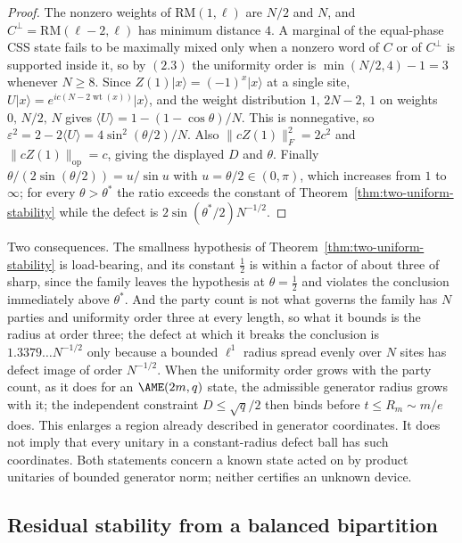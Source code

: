 \begin{proof}
The nonzero weights of \(\mathrm{RM}(1,\ell)\) are \(N/2\) and \(N\), and
\(C^\perp=\mathrm{RM}(\ell-2,\ell)\) has minimum distance \(4\).  A
marginal of the equal-phase CSS state fails to be maximally mixed only when
a nonzero word of \(C\) or of \(C^\perp\) is supported inside it, so by
\((2.3)\) the uniformity order is
\(\min(N/2,4)-1=3\) whenever \(N\geq8\).  Since
\(Z(1)\lvert x\rangle=(-1)^x\lvert x\rangle\) at a single site,
\(U\lvert x\rangle=e^{ic(N-2\operatorname{wt}(x))}\lvert x\rangle\), and
the weight distribution \(1,\,2N-2,\,1\) on weights \(0,\,N/2,\,N\) gives
\(\langle U\rangle=1-(1-\cos\theta)/N\).  This is nonnegative, so
\(\varepsilon^2=2-2\langle U\rangle=4\sin^2(\theta/2)/N\).  Also
\(\lVert cZ(1)\rVert_F^2=2c^2\) and
\(\lVert cZ(1)\rVert_{\mathrm{op}}=c\), giving the displayed \(D\) and
\(\theta\).  Finally \(\theta/(2\sin(\theta/2))=u/\sin u\) with
\(u=\theta/2\in(0,\pi)\), which increases from \(1\) to \(\infty\); for
every \(\theta>\theta^*\) the ratio exceeds the constant of
Theorem~\ref{thm:two-uniform-stability} while the defect is
\(2\sin(\theta^*/2)N^{-1/2}\).
\end{proof}

\AMEFigureFive

Two consequences.  The smallness hypothesis of
Theorem~\ref{thm:two-uniform-stability} is load-bearing, and its constant
\(\frac12\) is within a factor of about three of sharp, since the family
leaves the hypothesis at \(\theta=\frac12\) and violates the conclusion
immediately above \(\theta^*\).  And the party count is not what governs the
family has \(N\) parties and uniformity order three at every length, so
what it bounds is the radius at order three; the defect at which it breaks
the conclusion is \(1.3379\ldots N^{-1/2}\) only because a bounded
\(\ell^1\) radius spread evenly over \(N\) sites has defect image of order
\(N^{-1/2}\).  When the uniformity order grows with the party count, as it
does for an \(\AME(2m,q)\) state, the admissible generator radius grows with
it; the independent constraint \(D\leq\sqrt q/2\) then binds before
\(t\leq R_m\sim m/e\) does.  This enlarges a region already described in
generator coordinates.  It does not imply that every unitary in a
constant-radius defect ball has such coordinates.  Both statements concern
a known state acted on by product unitaries of bounded generator norm;
neither certifies an unknown device.

\subsection{Residual stability from a balanced bipartition}

